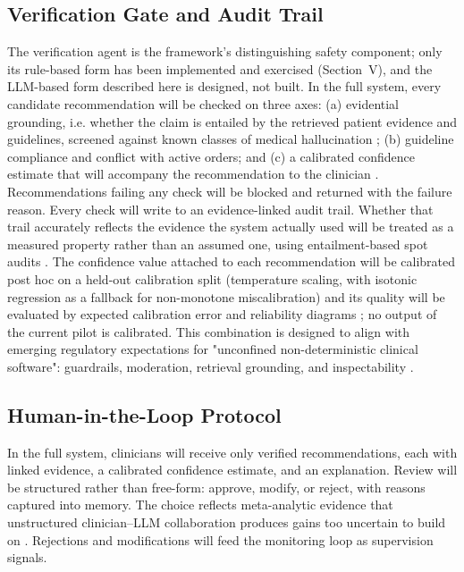 \subsection{Verification Gate and Audit Trail}

The verification agent is the framework's distinguishing safety component; only its
rule-based form has been implemented and exercised (Section~V), and the LLM-based form
described here is designed, not built. In the full system, every candidate recommendation
will be checked on three axes: (a) evidential grounding, i.e. whether the claim is
entailed by the retrieved patient evidence and guidelines, screened against known classes of
medical hallucination \cite{kim2025hallucinations}; (b) guideline compliance and conflict with
active orders; and (c) a calibrated confidence estimate that will accompany the recommendation to
the clinician \cite{atf2025uncertainty,guo2017calibration}. Recommendations failing any check will be
blocked and returned with the failure reason. Every check will write to an evidence-linked audit
trail. Whether that trail accurately reflects the evidence the system actually used will be treated
as a measured property rather than an assumed one, using entailment-based spot audits
\cite{es2024ragas}. The confidence value attached to each recommendation will be calibrated post hoc on
a held-out calibration split (temperature scaling, with isotonic regression as a fallback for
non-monotone miscalibration) and its quality will be evaluated by expected calibration error and
reliability diagrams \cite{guo2017calibration}; no output of the current pilot is calibrated.
This combination is designed to align with
emerging regulatory expectations for "unconfined non-deterministic clinical software":
guardrails, moderation, retrieval grounding, and inspectability
\cite{tan2026undcs,weissman2025unregulated}.

\subsection{Human-in-the-Loop Protocol}

In the full system, clinicians will receive only verified recommendations, each with linked
evidence, a calibrated confidence estimate, and an explanation. Review will be structured
rather than free-form: approve, modify, or reject, with reasons captured into memory. The
choice reflects meta-analytic evidence that unstructured clinician--LLM collaboration
produces gains too uncertain to build on \cite{wang2026collaboration}. Rejections and
modifications will feed the monitoring loop as supervision signals.

